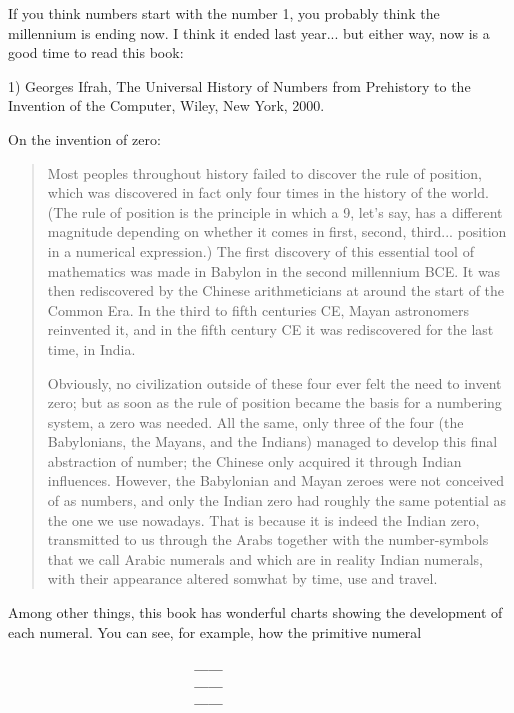 


If you think numbers start with the number 1, you probably think the
millennium is ending now.  I think it ended last year... but either 
way, now is a good time to read this book:

1) Georges Ifrah, The Universal History of Numbers from Prehistory to
the Invention of the Computer, Wiley, New York, 2000.

On the invention of zero:

\begin{quote}
     Most peoples throughout history failed to discover the rule of
     position, which was discovered in fact only four times in the 
     history of the world.  (The rule of position is the principle in
     which a 9, let's say, has a different magnitude depending on 
     whether it comes in first, second, third... position in a numerical 
     expression.)  The first discovery of this essential tool of  
     mathematics was made in Babylon in the second millennium BCE.  
     It was then rediscovered by the Chinese arithmeticians at around
     the start of the Common Era.  In the third to fifth centuries CE,
     Mayan astronomers reinvented it, and in the fifth century CE it
     was rediscovered for the last time, in India.

     Obviously, no civilization outside of these four ever felt the 
     need to invent zero; but as soon as the rule of position became
     the basis for a numbering system, a zero was needed.  All the same,
     only three of the four (the Babylonians, the Mayans, and the 
     Indians) managed to develop this final abstraction of number;
     the Chinese only acquired it through Indian influences.  However,
     the Babylonian and Mayan zeroes  were not conceived of as numbers,
     and only the Indian zero had roughly the same potential as the 
     one we use nowadays.  That is because it is indeed the Indian zero,
     transmitted to us through the Arabs together with the number-symbols
     that we call Arabic numerals and which are in reality Indian numerals,
     with their appearance altered somwhat by time, use and travel.

\end{quote}
    
Among other things, this book has wonderful charts showing the
development of each numeral.  You can see, for example, how the
primitive numeral
\begin{verbatim}
                          ____
                          ____
                          ____

\end{verbatim}
    
